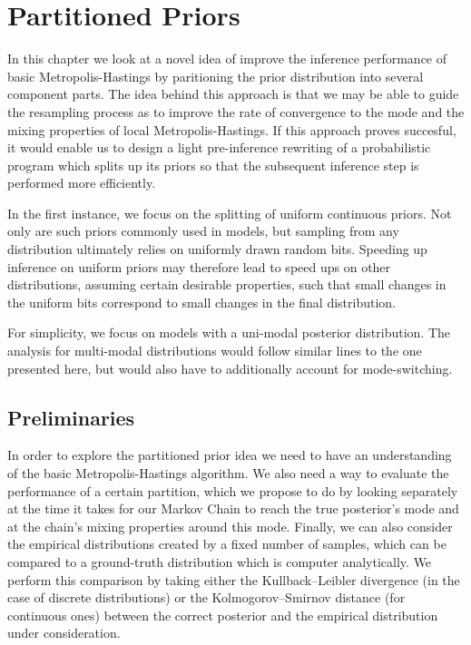 \chapter{Partitioned Priors}
\label{chap:partPriors}

In this chapter we look at a novel idea of improve the inference performance of basic Metropolis-Hastings by paritioning the prior distribution into several component parts. The idea behind this approach is that we may be able to guide the resampling process as to improve the rate of convergence to the mode and the mixing properties of local Metropolis-Hastings.  If this approach proves succesful, it would enable us to design a light pre-inference rewriting of a probabilistic program which splits up its priors so that the subsequent inference step is performed more efficiently.

In the first instance, we focus on the splitting of uniform continuous priors. Not only are such priors commonly used in models, but sampling from any distribution ultimately relies on uniformly drawn random bits. Speeding up inference on uniform priors may therefore lead to speed ups on other distributions, assuming certain desirable properties, such that small changes in the uniform bits correspond to small changes in the final distribution. 

For simplicity, we focus on models with a uni-modal posterior distribution. The analysis for multi-modal distributions would follow similar lines to the one presented here, but would also have to additionally account for mode-switching.

\section{Preliminaries}

In order to explore the partitioned prior idea we need to have an understanding of the basic Metropolis-Hastings algorithm. We also need a way to evaluate the performance of a certain partition, which we propose to do by looking separately at the time it takes for our Markov Chain to reach the true posterior's mode and at the chain's mixing properties around this mode. Finally, we can also consider the empirical distributions created by a fixed number of samples, which can be compared to a ground-truth distribution which is computer analytically. We perform this comparison by taking either the Kullback–Leibler divergence \cite{kullback1951information} (in the case of discrete distributions) or the Kolmogorov–Smirnov distance \cite{massey1951kolmogorov} (for continuous ones) between the correct posterior and the empirical distribution under consideration. 

